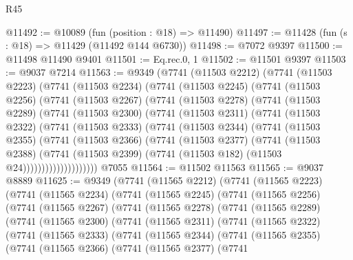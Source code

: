 \begin{lexlean}{R45}
\begin{coremodule}
{@11492 := @10089 (fun (position : @18) => @11490)
@11497 := @11428 (fun (s : @18) => @11429 (@11492 @144 @6730))
@11498 := @7072 @9397
@11500 := @11498 @11490 @9401
@11501 := Eq.rec.{0, 1}
@11502 := @11501 @9397
@11503 := @9037 @7214
@11563 := @9349
    (@7741
      (@11503 @2212)
      (@7741
        (@11503 @2223)
        (@7741
          (@11503 @2234)
          (@7741
            (@11503 @2245)
            (@7741
              (@11503 @2256)
              (@7741
                (@11503 @2267)
                (@7741
                  (@11503 @2278)
                  (@7741
                    (@11503 @2289)
                    (@7741
                      (@11503 @2300)
                      (@7741
                        (@11503 @2311)
                        (@7741
                          (@11503 @2322)
                          (@7741
                            (@11503 @2333)
                            (@7741
                              (@11503 @2344)
                              (@7741
                                (@11503 @2355)
                                (@7741
                                  (@11503 @2366)
                                  (@7741
                                    (@11503 @2377)
                                    (@7741
                                      (@11503 @2388)
                                      (@7741
                                        (@11503 @2399)
                                        (@7741 (@11503 @182) (@11503 @24))))))))))))))))))))
    @7055
@11564 := @11502 @11563
@11565 := @9037 @8889
@11625 := @9349
    (@7741
      (@11565 @2212)
      (@7741
        (@11565 @2223)
        (@7741
          (@11565 @2234)
          (@7741
            (@11565 @2245)
            (@7741
              (@11565 @2256)
              (@7741
                (@11565 @2267)
                (@7741
                  (@11565 @2278)
                  (@7741
                    (@11565 @2289)
                    (@7741
                      (@11565 @2300)
                      (@7741
                        (@11565 @2311)
                        (@7741
                          (@11565 @2322)
                          (@7741
                            (@11565 @2333)
                            (@7741
                              (@11565 @2344)
                              (@7741
                                (@11565 @2355)
                                (@7741
                                  (@11565 @2366)
                                  (@7741
                                    (@11565 @2377)
                                    (@7741
}
\end{coremodule}
\end{lexlean}
